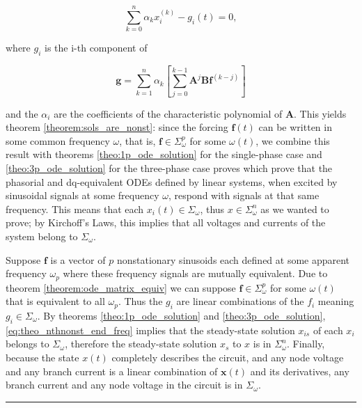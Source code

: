 \begin{equation} \sum_{k=0}^n \alpha_k x_i^{(k)} - g_i(t) = 0, \label{eq:theo_nthnonst_end_freq}\end{equation}

	\noindent where $g_i$ is the i-th component of

\begin{equation} \mathbf{g} = \sum_{k=1}^n \alpha_k \left[\sum_{j=0}^{k-1} \mathbf{A}^j \mathbf{Bf}^{(k-j)}\right] \label{eq:theo_nthnonst_g_freq}\end{equation}

	\noindent and the $\alpha_i$ are the coefficients of the characteristic polynomial of $\mathbf{A}$. This yields theorem \ref{theorem:sols_are_nonst}: since the forcing $\mathbf{f}(t)$ can be written in some common frequency $\omega$, that is, $\mathbf{f}\in\Sigma_\omega^p$ for some $\omega(t)$, we combine this result with theorems \ref{theo:1p_ode_solution} for the single-phase case and \ref{theo:3p_ode_solution} for the three-phase case proves which prove that the phasorial and dq-equivalent ODEs defined by linear systems, when excited by sinusoidal signals at some frequency $\omega$, respond with signals at that same frequency. This means that each $x_i(t)\in\Sigma_\omega$, thus $x\in\Sigma_\omega^n$ as we wanted to prove; by Kirchoff's Laws, this implies that all voltages and currents of the system belong to $\Sigma_\omega$.

\begin{theorem}\label{theorem:sols_are_nonst} %
	Suppose $\mathbf{f}$ is a vector of $p$ nonstationary sinusoids each defined at some apparent frequency $\omega_p$ where these frequency signals are mutually equivalent. Due to theorem \ref{theorem:ode_matrix_equiv} we can suppose $\mathbf{f}\in \Sigma_\omega^p$ for some $\omega(t)$ that is equivalent to all $\omega_p$. Thus the $g_i$ are linear combinations of the $f_i$ meaning $g_i\in\Sigma_\omega$. By theorems \ref{theo:1p_ode_solution} and \ref{theo:3p_ode_solution}, \eqref{eq:theo_nthnonst_end_freq} implies that the steady-state solution $x_{is}$ of each $x_i$ belongs to $\Sigma_\omega$, therefore the steady-state solution $x_s$ to $x$ is in $\Sigma_\omega^n$. Finally, because the state $x(t)$ completely describes the circuit, and any node voltage and any branch current is a linear combination of $\mathbf{x}(t)$ and its derivatives, any branch current and any node voltage in the circuit is in $\Sigma_\omega$.
\end{theorem} \vspace{5mm}\hrule\vspace{5mm}%

